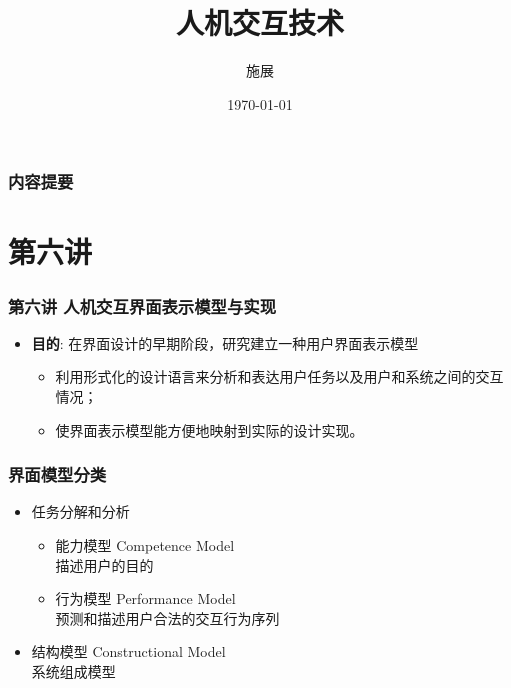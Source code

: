 \documentclass{beamer}
\title{人机交互技术}
\author{施展}
\institute{华中科技大学~武汉光电国家实验室}
\date{\today}
\begin{document}
\begin{frame}
	\titlepage
\end{frame}

\begin{frame}
	\frametitle{内容提要}
	\tableofcontents
\end{frame}

\section{第六讲}
\begin{frame}
	\frametitle{第六讲 人机交互界面表示模型与实现}
	\begin{itemize}
		\item \textbf{目的}: 在界面设计的早期阶段，研究建立一种用户界面表示模型
		\begin{itemize}
			\item 利用形式化的设计语言来分析和表达用户任务以及用户和系统之间的交互情况；
			\item 使界面表示模型能方便地映射到实际的设计实现。
		\end{itemize}
	\end{itemize}
\end{frame}

\begin{frame}
	\frametitle{界面模型分类}
	\begin{itemize}
		\item 任务分解和分析
		\begin{itemize}
			\item 能力模型 Competence Model\\描述用户的目的
			\item 行为模型 Performance Model\\预测和描述用户合法的交互行为序列
		\end{itemize}
		\item 结构模型 Constructional Model\\系统组成模型
	\end{itemize}
\end{frame}
\end{document}
